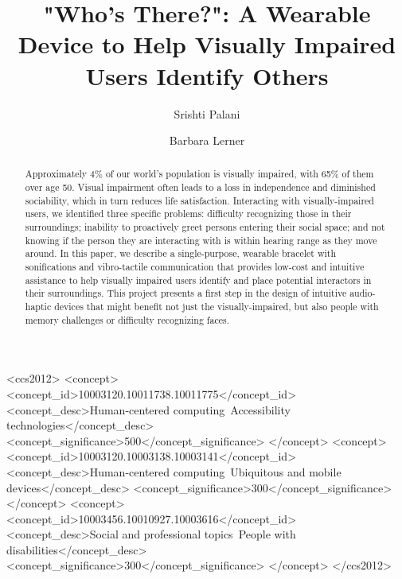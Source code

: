 \documentclass[sigchi, review, anonymous]{acmart}
\begin{document}
\title["Who's There?": A Wearable Device to Identify Others]{"Who's There?": A Wearable  Device to Help Visually Impaired Users Identify Others}

\author{Srishti Palani}

\author{Barbara Lerner}




\begin{abstract}
Approximately 4\% of our world's population is visually impaired, with 65\% of them over age 50. Visual impairment often leads to a loss in independence and diminished sociability, which in turn reduces life satisfaction. Interacting with visually-impaired users, we identified three specific problems: difficulty recognizing those in their surroundings; inability to proactively greet persons entering their social space; and not knowing if the person they are interacting with is within hearing range as they move around. In this paper, we describe a single-purpose, wearable bracelet with sonifications and vibro-tactile communication that provides low-cost and intuitive assistance to help visually impaired users identify and place potential interactors in their surroundings.  This project presents a first step in the design of intuitive audio-haptic devices that might benefit not just the visually-impaired, but also people with memory challenges or difficulty recognizing faces.
\end{abstract}

%
%
 \begin{CCSXML}
<ccs2012>
<concept>
<concept_id>10003120.10011738.10011775</concept_id>
<concept_desc>Human-centered computing~Accessibility technologies</concept_desc>
<concept_significance>500</concept_significance>
</concept>
<concept>
<concept_id>10003120.10003138.10003141</concept_id>
<concept_desc>Human-centered computing~Ubiquitous and mobile devices</concept_desc>
<concept_significance>300</concept_significance>
</concept>
<concept>
<concept_id>10003456.10010927.10003616</concept_id>
<concept_desc>Social and professional topics~People with disabilities</concept_desc>
<concept_significance>300</concept_significance>
</concept>
</ccs2012>
\end{CCSXML}
\end{document}
